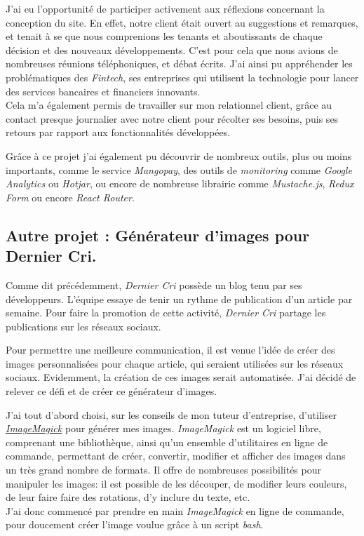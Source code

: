 \documentclass[12pt,a4paper]{article}
\begin{document}
  \bigskip

  J'ai eu l'opportunité de participer activement aux réflexions concernant
  la conception du site. En effet, notre client était ouvert au
  suggestions et remarques, et tenait à se que nous comprenions les
  tenants et aboutissants de chaque décision et des nouveaux
  développements. C'est pour cela que nous avions de nombreuses réunions
  téléphoniques, et débat écrits. J'ai ainsi pu appréhender les
  problématiques des \emph{Fintech}, ses entreprises qui utilisent la
  technologie pour lancer des services bancaires et financiers
  innovants.\\
  Cela m'a également permis de travailler sur mon relationnel client,
  grâce au contact presque journalier avec notre client pour récolter ses
  besoins, puis ses retours par rapport aux fonctionnalités développées.

  \bigskip

  Grâce à ce projet j'ai également pu découvrir de nombreux outils, plus
  ou moins importants, comme le service \emph{Mangopay}, des outils de
  \emph{monitoring} comme \emph{Google Analytics} ou \emph{Hotjar}, ou
  encore de nombreuse librairie comme \emph{Mustache.js}, \emph{Redux
  Form} ou encore \emph{React Router}.

  \bigskip

  \subsection{Autre projet : Générateur d'images pour Dernier
  Cri.}\label{autre-projet-guxe9nuxe9rateur-dimages-pour-dernier-cri.}

  \bigskip

  Comme dit précédemment, \emph{Dernier Cri} possède un blog tenu par ses
  développeurs. L'équipe essaye de tenir un rythme de publication d'un
  article par semaine. Pour faire la promotion de cette activité,
  \emph{Dernier Cri} partage les publications sur les réseaux sociaux.

  \bigskip

  Pour permettre une meilleure communication, il est venue l'idée de créer
  des images personnalisées pour chaque article, qui seraient utilisées
  sur les réseaux sociaux. Evidemment, la création de ces images serait
  automatisée. J'ai décidé de relever ce défi et de créer ce générateur
  d'images.

  \bigskip

  J'ai tout d'abord choisi, sur les conseils de mon tuteur d'entreprise,
  d'utiliser
  \href{https://www.imagemagick.org/script/index.php}{\emph{ImageMagick}}
  pour générer mes images. \emph{ImageMagick} est un logiciel libre,
  comprenant une bibliothèque, ainsi qu'un ensemble d'utilitaires en ligne
  de commande, permettant de créer, convertir, modifier et afficher des
  images dans un très grand nombre de formats. Il offre de nombreuses
  possibilités pour manipuler les images: il est possible de les découper,
  de modifier leurs couleurs, de leur faire faire des rotations, d'y
  inclure du texte, etc.\\
  J'ai donc commencé par prendre en main \emph{ImageMagick} en ligne de
  commande, pour doucement créer l'image voulue grâce à un script
  \emph{bash}.
\end{document}
